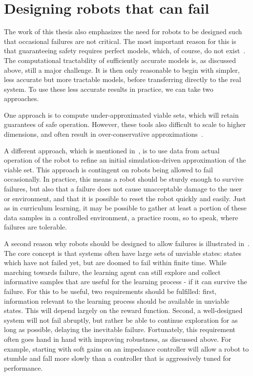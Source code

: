 \section{Designing robots that can fail}
The work of this thesis also emphasizes the need for robots to be designed such that occasional failures are not critical. The most important reason for this is that guaranteeing safety requires perfect models, which, of course, do not exist~\cite{box1976science}. The computational tractability of sufficiently accurate models is, as discussed above, still a major challenge. It is then only reasonable to begin with simpler, less accurate but more tractable models, before transferring directly to the real system. To use these less accurate results in practice, we can take two approaches. \par
One approach is to compute under-approximated viable sets, which will retain guarantees of safe operation. However, these tools also difficult to scale to higher dimensions, and often result in over-conservative approximations~\cite{manchester2011regions}. \par
A different approach, which is mentioned in~\cite{heim2019learnable}, is to use data from actual operation of the robot to refine an initial simulation-driven approximation of the viable set. This approach is contingent on robots being allowed to fail occasionally. In practice, this means a robot should be sturdy enough to survive failures, but also that a failure does not cause unacceptable damage to the user or environment, and that it is possible to reset the robot quickly and easily. Just as in curriculum learning, it may be possible to gather at least a portion of these data samples in a controlled environment, a practice room, so to speak, where failures are tolerable. \par

A second reason why robots should be designed to allow failures is illustrated in~\cite{heim2018unviable}. The core concept is that systems often have large sets of unviable states: states which have not failed yet, but are doomed to fail within finite time. While marching towards failure, the learning agent can still explore and collect informative samples that are useful for the learning process - if it can survive the failure. For this to be useful, two requirements should be fulfilled: first, information relevant to the learning process should be available in unviable states. This will depend largely on the reward function. Second, a well-designed system will not fail abruptly, but rather be able to continue exploration for as long as possible, delaying the inevitable failure. Fortunately, this requirement often goes hand in hand with improving robustness, as discussed above. For example, starting with soft gains on an impedance controller will allow a robot to stumble and fall more slowly than a controller that is aggressively tuned for performance.

